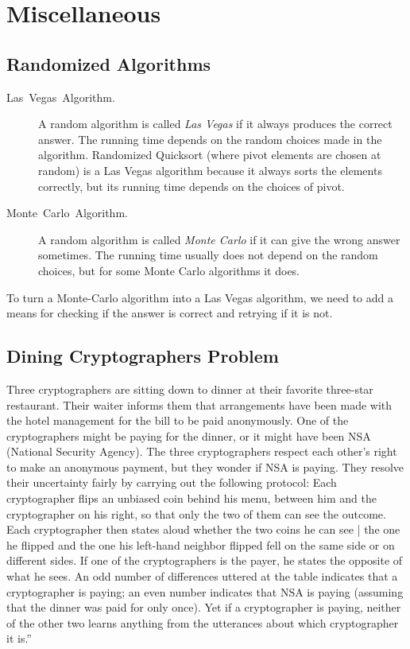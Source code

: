 \documentclass[11pt]{article}
\theoremstyle{plain}
\begin{document}
\section{Miscellaneous}

\subsection{Randomized Algorithms}
\begin{description}
	\item [{Las~Vegas~Algorithm.}] A random algorithm is called \emph{Las
		Vegas} if it always produces the correct answer. The running time
	depends on the random choices made in the algorithm. Randomized Quicksort
	(where pivot elements are chosen at random) is a Las Vegas algorithm
	because it always sorts the elements correctly, but its running time
	depends on the choices of pivot.
	\item [{Monte~Carlo~Algorithm.}] A random algorithm is called \emph{Monte
		Carlo} if it can give the wrong answer sometimes. The running time
	usually does not depend on the random choices, but for some Monte
	Carlo algorithms it does.
\end{description}
To turn a Monte-Carlo algorithm into a Las Vegas algorithm, we need
to add a means for checking if the answer is correct and retrying
if it is not.

\subsection{Dining Cryptographers Problem}

Three cryptographers are sitting down to dinner at their favorite
three-star restaurant. Their waiter informs them that arrangements
have been made with the hotel management for the bill to be paid anonymously.
One of the cryptographers might be paying for the dinner, or it might
have been NSA (National Security Agency). The three cryptographers
respect each other's right to make an anonymous payment, but they
wonder if NSA is paying. They resolve their uncertainty fairly by
carrying out the following protocol: Each cryptographer flips an unbiased
coin behind his menu, between him and the cryptographer on his right,
so that only the two of them can see the outcome. Each cryptographer
then states aloud whether the two coins he can see | the one he flipped
and the one his left-hand neighbor flipped fell on the same side or
on different sides. If one of the cryptographers is the payer, he
states the opposite of what he sees. An odd number of differences
uttered at the table indicates that a cryptographer is paying; an
even number indicates that NSA is paying (assuming that the dinner
was paid for only once). Yet if a cryptographer is paying, neither
of the other two learns anything from the utterances about which cryptographer
it is.''
\end{document}
